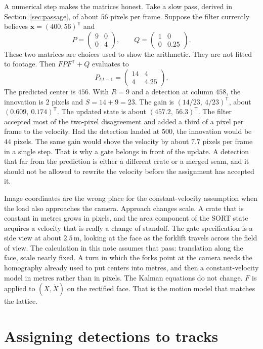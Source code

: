 \documentclass[11pt,a4paper]{article}
\begin{document}
A numerical step makes the matrices honest. Take a slow pass, derived in Section~\ref{sec:passage}, of about $56$ pixels per frame. Suppose the filter currently believes $\mathbf{x}=(400, 56)^{\mathsf T}$ and
\[
P = \begin{pmatrix} 9 & 0 \\ 0 & 4 \end{pmatrix},
\qquad
Q = \begin{pmatrix} 1 & 0 \\ 0 & 0.25 \end{pmatrix}.
\]
These two matrices are choices used to show the arithmetic. They are not fitted to footage. Then $FPF^{\mathsf T}+Q$ evaluates to
\[
P_{t|t-1} = \begin{pmatrix} 14 & 4 \\ 4 & 4.25 \end{pmatrix}.
\]
The predicted center is $456$. With $R=9$ and a detection at column $458$, the innovation is $2$ pixels and $S=14+9=23$. The gain is $(14/23,\ 4/23)^{\mathsf T}$, about $(0.609,\ 0.174)^{\mathsf T}$. The updated state is about $(457.2,\ 56.3)^{\mathsf T}$. The filter accepted most of the two-pixel disagreement and added a third of a pixel per frame to the velocity. Had the detection landed at $500$, the innovation would be $44$ pixels. The same gain would shove the velocity by about $7.7$ pixels per frame in a single step. That is why a gate belongs in front of the update. A detection that far from the prediction is either a different crate or a merged seam, and it should not be allowed to rewrite the velocity before the assignment has accepted it.

Image coordinates are the wrong place for the constant-velocity assumption when the load also approaches the camera. Approach changes scale. A crate that is constant in metres grows in pixels, and the area component of the SORT state acquires a velocity that is really a change of standoff. The gate specification is a side view at about $2.5\,\mathrm{m}$, looking at the face as the forklift travels across the field of view. The calculation in this note assumes that pass: translation along the face, scale nearly fixed. A turn in which the forks point at the camera needs the homography already used to put centers into metres, and then a constant-velocity model in metres rather than in pixels. The Kalman equations do not change. $F$ is applied to $(X,\dot X)$ on the rectified face. That is the motion model that matches the lattice.

\section{Assigning detections to tracks}
\label{sec:assign}
\end{document}
